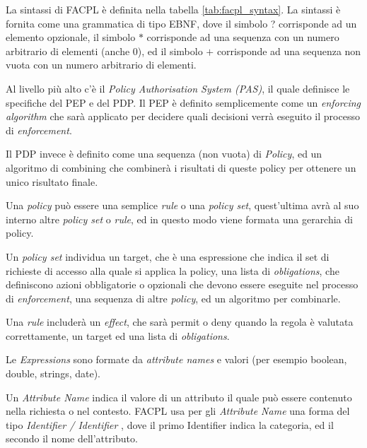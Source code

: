 La sintassi di FACPL è definita nella tabella \ref{tab:facpl_syntax}.
La sintassi è fornita come una grammatica di tipo EBNF, dove il simbolo ? corrisponde ad un elemento opzionale, il simbolo $*$ corrisponde ad una sequenza con un numero arbitrario di elementi (anche 0), ed il simbolo $+$ corrisponde ad una sequenza non vuota con un numero arbitrario di elementi.\\ \par
Al livello più alto c'è il \textit{Policy Authorisation System (PAS)}, il quale definisce le specifiche del PEP e del PDP.
Il PEP è definito semplicemente come un \textit{enforcing algorithm} che sarà applicato per decidere quali decisioni verrà eseguito il processo di \textit{enforcement}. \\ \par
Il PDP invece è definito come una sequenza (non vuota) di \textit{Policy}, ed un algoritmo di combining che combinerà i risultati di queste policy per ottenere un unico risultato finale.\\ \par
Una \textit{policy} può essere una semplice \textit{rule} o una \textit{policy set}, quest'ultima avrà al suo interno altre \textit{policy set} o \textit{rule}, ed in questo modo viene formata una gerarchia di policy.\\ \par
Un \textit{policy set} individua un target, che è una espressione che indica il set di richieste di accesso alla quale si applica la policy, una lista di \textit{obligations}, che definiscono azioni obbligatorie o opzionali che devono essere eseguite nel processo di \textit{enforcement}, una sequenza di altre \textit{policy}, ed un algoritmo per combinarle.\\ \par
Una \textit{rule} includerà un \textit{effect}, che sarà permit o deny quando la regola è valutata correttamente, un target ed una lista di \textit{obligations}.\\ \par
Le \textit{Expressions} sono formate da \textit{attribute names} e valori (per esempio boolean, double, strings, date).\\ \par
Un \textit{Attribute Name} indica il valore di un attributo il quale può essere contenuto nella richiesta o nel contesto. FACPL usa per gli \textit{Attribute Name} una forma del tipo \textit{Identifier / Identifier }, dove il primo Identifier indica la categoria, ed il secondo il nome dell'attributo.
